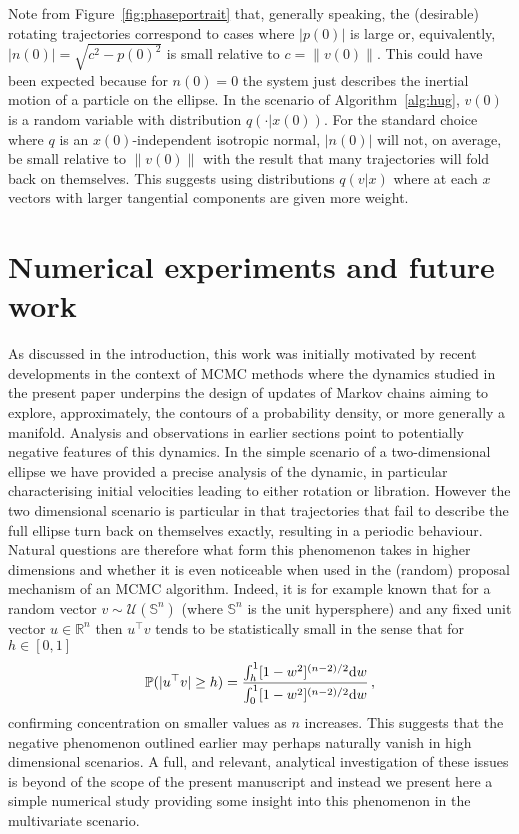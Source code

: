 \documentclass[10pt]{article}
\begin{document}
Note from Figure~\ref{fig:phaseportrait} that, generally speaking, the (desirable) rotating trajectories correspond to cases where \(|p(0)|\) is large or, equivalently, \(|n(0)| = \sqrt{c^2-p(0)^2}\) is small relative to \(c=\|v(0)\|\). This could have been expected because for \(n(0) =0\) the system just describes the inertial motion of a particle on the ellipse. In the scenario of Algorithm~\ref{alg:hug}, \(v(0)\) is a random variable with distribution \(q(\cdot|x(0))\). For the standard choice where \(q\) is an \(x(0)\)-independent isotropic normal, \(|n(0)|\) will not, on average, be small relative to \(\|v(0)\|\) with the result that many trajectories will fold back on themselves. This suggests using distributions \(q(v|x)\) where at each \(x\) vectors with larger tangential components are given more weight.


\section{Numerical experiments and future work}\label{sec:Numerical-experiments-and}

As discussed in the introduction, this work was initially motivated
by recent developments in the context of MCMC methods where the dynamics
studied in the present paper underpins the design of updates of Markov
chains aiming to explore, approximately, the contours of a probability
density, or more generally a manifold. Analysis and observations in
earlier sections point to potentially negative features of this dynamics.
In the simple scenario of a two-dimensional ellipse we have provided
a precise analysis of the dynamic, in particular characterising initial
velocities leading to either rotation or libration. However the two
dimensional scenario is particular in that trajectories that fail
to describe the full ellipse turn back on themselves exactly, resulting
in a periodic behaviour. Natural questions are therefore what form
this phenomenon takes in higher dimensions and whether it is even
noticeable when used in the (random) proposal mechanism of an MCMC
algorithm. Indeed, it is for example known that for a random vector
$v\sim\mathcal{U}(\mathbb{S}^{n})$ (where $\mathbb{S}^{n}$ is the
unit hypersphere) and any fixed unit vector $u\in\mathbb{R}^{n}$
then $u^{\top}v$ tends to be statistically small in the sense that
for $h\in[0,1]$
\[
\mathbb{P}(|u^{\top}v|\geq h)=\frac{\int_{h}^{1}[1-w^{2}]^{(n-2)/2}{\rm d}w}{\int_{0}^{1}[1-w^{2}]^{(n-2)/2}{\rm d}w}\,,
\]
confirming concentration on smaller values as $n$ increases. This
suggests that the negative phenomenon outlined earlier may perhaps naturally
vanish in high dimensional scenarios. A full, and relevant, analytical
investigation of these issues is beyond of the scope of the present
manuscript and instead we present here a simple numerical study providing
some insight into this phenomenon in the multivariate scenario.
\end{document}
